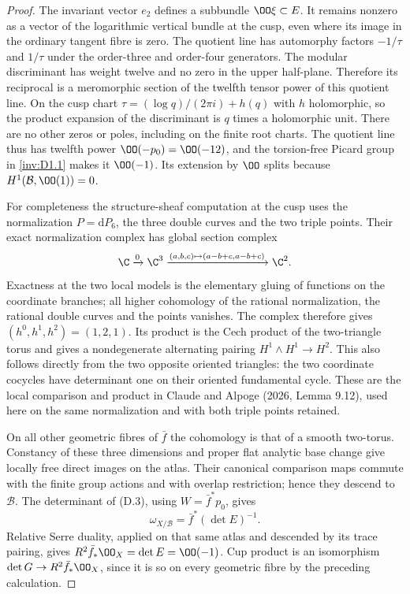 \begin{proof}
The invariant vector $e_2$ defines a subbundle $\OO\xi\subset E$.
It remains nonzero as a vector of the logarithmic vertical bundle at
the cusp, even where its image in the ordinary tangent fibre is zero.
The quotient line has automorphy factors $-1/\tau$ and $1/\tau$ under
the order-three and order-four generators. The modular discriminant
has weight twelve and no zero in the upper half-plane. Therefore its
reciprocal is a meromorphic section of the twelfth tensor power of
this quotient line. On the cusp chart
$\tau=(\log q)/(2\pi i)+h(q)$ with $h$ holomorphic, so the product
expansion of the discriminant is $q$ times a holomorphic unit.
There are no other zeros or poles, including on the finite root
charts. The quotient line thus has twelfth power
$\OO(-p_0)=\OO(-12)$, and the torsion-free Picard group in \ref{inv:D1.1} makes
it $\OO(-1)$. Its extension by $\OO$ splits because
$H^1(\mathcal B,\OO(1))=0$.

For completeness the structure-sheaf computation at the cusp uses the
normalization $P=\mathrm dP_6$, the three double curves and the two
triple points. Their exact normalization complex has global section
complex
\[
 \C\xrightarrow{0}\C^3
 \xrightarrow{(a,b,c)\mapsto(a-b+c,a-b+c)}\C^2.
\]
Exactness at the two local models is the elementary gluing of functions
on the coordinate branches; all higher cohomology of the rational
normalization, the rational double curves and the points vanishes.
The complex therefore gives $(h^0,h^1,h^2)=(1,2,1)$. Its product is
the Cech product of the two-triangle torus and gives a nondegenerate
alternating pairing $H^1\wedge H^1\to H^2$. This also follows directly
from the two opposite oriented triangles: the two coordinate cocycles
have determinant one on their oriented fundamental cycle. These are
the local comparison and product in Claude and Alpoge (2026,
Lemma 9.12), used here on the same normalization and with both triple
points retained.

On all other geometric fibres of $\bar f$ the cohomology is that of a
smooth two-torus. Constancy of these three dimensions and proper flat
analytic base change give locally free direct images on the atlas.
Their canonical comparison maps commute with the finite group actions
and with overlap restriction; hence they descend to $\mathcal B$.
The determinant of (D.3), using $W=\bar f^*p_0$, gives
\[
 \omega_{X/\mathcal B}=\bar f^*(\det E)^{-1}.
\]
Relative Serre duality, applied on that same atlas and descended by
its trace pairing, gives $R^2\bar f_*\OO_X=\det E=\OO(-1)$.
Cup product is an isomorphism $\det G\to R^2\bar f_*\OO_X$, since it
is so on every geometric fibre by the preceding calculation.


\end{proof}
